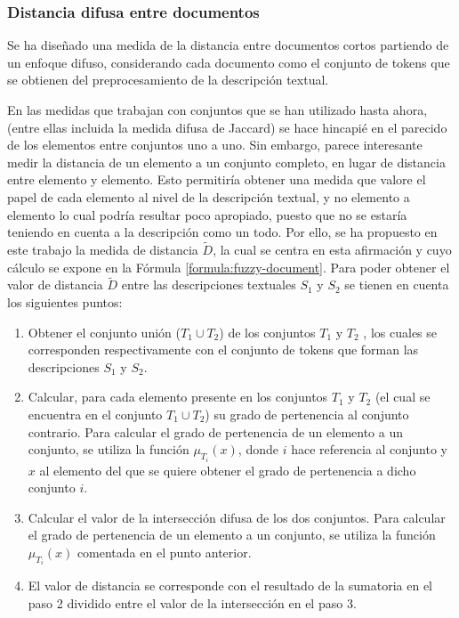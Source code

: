 \subsubsection{Distancia difusa entre documentos}
Se ha diseñado una medida de la distancia entre documentos cortos partiendo de un enfoque difuso, considerando cada documento como el conjunto de tokens que se obtienen del preprocesamiento de la descripción textual.

En las medidas que trabajan con conjuntos que se han utilizado hasta ahora, (entre ellas incluida la medida difusa de Jaccard) se hace hincapié en el parecido de los elementos entre conjuntos uno a uno. Sin embargo, parece interesante medir la distancia de un elemento a un conjunto completo, en lugar de distancia entre elemento y elemento. Esto permitiría obtener una medida que valore el papel de cada elemento al nivel de la descripción textual, y no elemento a elemento lo cual podría resultar poco apropiado, puesto que no se estaría teniendo en cuenta a la descripción como un todo. Por ello, se ha propuesto en este trabajo la medida de distancia $\tilde{D}$, la cual se centra en esta afirmación y cuyo cálculo se expone en la Fórmula \ref{formula:fuzzy-document}. Para poder obtener el valor de distancia $\tilde{D}$ entre las descripciones textuales $S_{1}$ y $S_{2}$ se tienen en cuenta los siguientes puntos:

\begin{enumerate}
    \item Obtener el conjunto unión ($T_{1}\cup T_{2}$) de los conjuntos $T_{1}$ y $T_{2}$ , los cuales se corresponden respectivamente con el conjunto de tokens que forman las descripciones $S_{1}$ y $S_{2}$. %
    
    \item Calcular, para cada elemento presente en los conjuntos $T_{1}$ y $T_{2}$ (el cual se encuentra en el conjunto $T_{1}\cup T_{2}$) su grado de pertenencia al conjunto contrario. Para calcular el grado de pertenencia de un elemento a un conjunto, se utiliza la función $\mu_{T_{i}}(x)$, donde $i$ hace referencia al conjunto y $x$ al elemento del que se quiere obtener el grado de pertenencia a dicho conjunto $i$.
    

    \item Calcular el valor de la intersección difusa de los dos conjuntos. Para calcular el grado de pertenencia de un elemento a un conjunto, se utiliza la función $\mu_{T_{i}}(x)$ comentada en el punto anterior.
    \item El valor de distancia se corresponde con el resultado de la sumatoria en el paso 2 dividido entre el valor de la intersección en el paso 3.
\end{enumerate}

